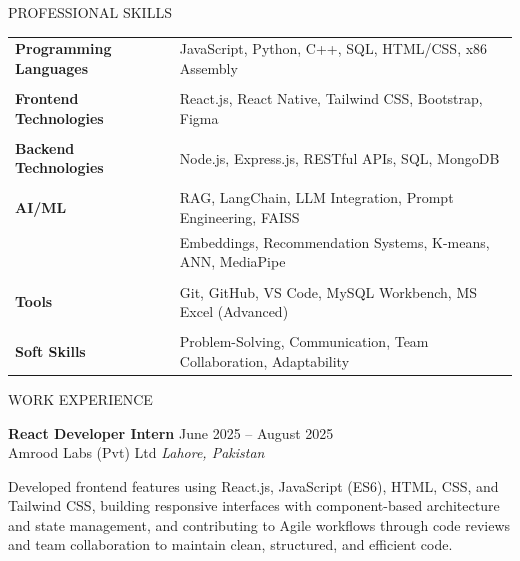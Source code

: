 \documentclass{resume} %
\begin{document}
\begin{rSection}{PROFESSIONAL SKILLS}

\begin{tabular}{ @{} >{\bfseries}l @{\hspace{4ex}} l }
Programming Languages & JavaScript, Python, C++, SQL, HTML/CSS, x86 Assembly \\ \\
Frontend Technologies & React.js, React Native, Tailwind CSS, Bootstrap, Figma \\ \\
Backend Technologies & Node.js, Express.js, RESTful APIs, SQL, MongoDB \\ \\
AI/ML & RAG, LangChain, LLM Integration, Prompt Engineering, FAISS \\
      & Embeddings, Recommendation Systems, K-means, ANN, MediaPipe \\ \\
Tools & Git, GitHub, VS Code, MySQL Workbench, MS Excel (Advanced) \\ \\
Soft Skills & Problem-Solving, Communication, Team Collaboration, Adaptability \\
\end{tabular}

\end{rSection}


\begin{rSection}{WORK EXPERIENCE}

\textbf{React Developer Intern} \hfill June 2025 -- August 2025\\
Amrood Labs (Pvt) Ltd \hfill \textit{Lahore, Pakistan}

Developed frontend features using React.js, JavaScript (ES6), HTML, CSS, and Tailwind CSS, building responsive interfaces with component-based architecture and state management, and contributing to Agile workflows through code reviews and team collaboration to maintain clean, structured, and efficient code.

\end{rSection}
\end{document}
